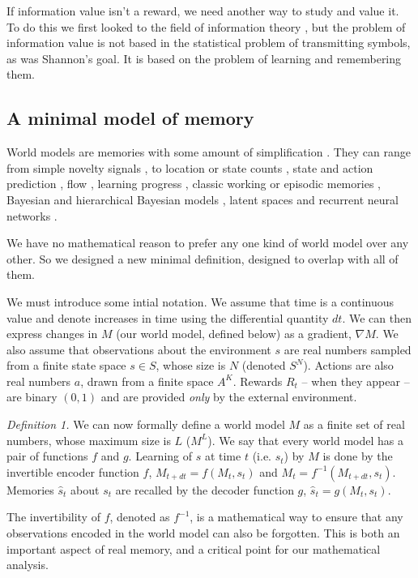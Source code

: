 \documentclass[9pt,twocolumn,twoside]{pnas-new}
\begin{document}
If information value isn't a reward, we need another way to study and value it. To do this we first looked to the field of information theory \cite{Shannon1948}, but the problem of information value is not based in the statistical problem of transmitting symbols, as was Shannon’s goal. It is based on the problem of learning and remembering them.

\subsection*{A minimal model of memory}
World models are memories with some amount of simplification \cite{Schmidhuber1991,Ha2018}. They can range from simple novelty signals \cite{Kakade2002}, to location or state counts \cite{Bellemare2016,Dayan1993}, state and action prediction \cite{Schmidhuber1991,Pathak2017,Friston2016}, flow \cite{Yang2019}, learning progress \cite{Lopes2012}, classic working or episodic memories \cite{Miller1956,Tulving2002}, Bayesian and hierarchical Bayesian models \cite{Park2017,Itti2009,Friston2016,Tenenbaum2006}, latent spaces \cite{Kingma2013} and recurrent neural networks \cite{Ganguli2008,Ha2018,Schmidhuber2015a,Mante2013}. 

We have no mathematical reason to prefer any one kind of world model over any other. So we designed a new minimal definition, designed to overlap with all of them.

We must introduce some intial notation. We assume that time is a continuous value and denote increases in time using the differential quantity $dt$. We can then express changes in $M$ (our world model, defined below) as a gradient, $\nabla M$. We also assume that observations about the environment $s$ are real numbers sampled from a finite state space $s \in S$, whose size is $N$ (denoted $S^N$). Actions are also real numbers $a$, drawn from a finite space $A^K$. Rewards $R_t$ -- when they appear -- are binary $(0,1)$ and are provided \textit{only} by the external environment. 

\textit{Definition 1.} We can now formally define a world model $M$ as a finite set of real numbers, whose maximum size is $L$ ($M^L$). We say that every world model has a pair of functions $f$ and $g$. Learning of $s$ at time $t$ (i.e. $s_t$) by $M$ is done by the invertible encoder function $f$, $M_{t+dt} = f(M_{t}, s_{t})$ and $M_{t} = f^{-1}(M_{t+dt}, s_{t})$. Memories $\hat s_t$ about $s_t$ are recalled by the decoder function $g$, $\hat s_t = g(M_t, s_t)$. 

The invertibility of $f$, denoted as $f^{-1}$, is a mathematical way to ensure that any observations encoded in the world model can also be forgotten. This is both an important aspect of real memory, and a critical point for our mathematical analysis.
\end{document}

